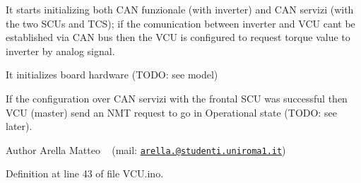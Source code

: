 \begin{DoxyItemize}
\item It starts initializing both C\+AN funzionale (with inverter) and C\+AN servizi (with the two S\+C\+Us and T\+CS); if the comunication between inverter and V\+CU can\textquotesingle{}t be established via C\+AN bus then the V\+CU is configured to request torque value to inverter by analog signal.
\item It initializes board hardware (T\+O\+DO\+: see model)
\item If the configuration over C\+AN servizi with the frontal S\+CU was successful then V\+CU (master) send an N\+MT request to go in \textquotesingle{}Operational\textquotesingle{} state (T\+O\+DO\+: see later). \begin{DoxyAuthor}{Author}
Arella Matteo ~\newline
 (mail\+: \href{mailto:arella.1646983@studenti.uniroma1.it}{\tt arella.@studenti.\+uniroma1.\+it}) 
\end{DoxyAuthor}

\end{DoxyItemize}

Definition at line 43 of file V\+C\+U.\+ino.

